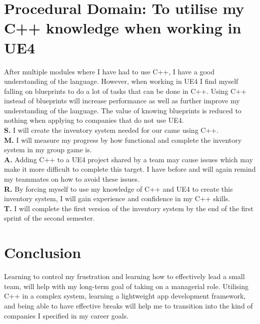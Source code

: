 \documentclass{scrartcl}
\begin{document}
\section{Procedural Domain: To utilise my C++ knowledge when working in UE4}
After multiple modules where I have had to use C++, I have a good understanding of the language.  However, when working in UE4 I find myself falling on blueprints to do a lot of tasks that can be done in C++. Using C++ instead of blueprints will increase performance as well as further improve my understanding of the language. The value of knowing blueprints is reduced to nothing when applying to companies that do not use UE4.\\
\textbf{S.} I will create the inventory system needed for our came using C++. \\
\textbf{M.} I will measure my progress by how functional and complete the inventory system in my group game is.\\
\textbf{A.} Adding C++ to a UE4 project shared by a team may cause issues which may make it more difficult to complete this target. I have before and will again remind my teammates on how to avoid these issues. \\
\textbf{R.}  By forcing myself to use my knowledge of C++ and UE4 to create this inventory system, I will gain experience and confidence in my C++ skills.\\
\textbf{T.}  I will complete the first version of the inventory system by the end of the first sprint of the second semester.\\

\section{Conclusion}
Learning to control my frustration and learning how to effectively lead a small team, will help with my long-term goal of taking on a managerial role. Utilising C++ in a complex system,  learning a lightweight app development framework, and being able to have effective breaks will help me to transition into the kind of companies I specified in my career goals.



\end{document}
